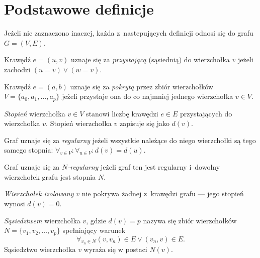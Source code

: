 \section{Podstawowe definicje}\label{s_definitions}

Jeżeli nie zaznaczono inaczej, każda z~nastepujących definicji odnosi się do
grafu $G=(V,E)$.

\begin{definition}
  Krawędź $e=(u,v)$ uznaje się za \emph{przystającą} (sąsiednią) do wierzchołka $v$
  jeżeli zachodzi $(u=v) \lor (w=v)$.
\end{definition}

\begin{definition}
  Krawędź $e=(a,b)$ uznaje się za \emph{pokrytą} przez zbiór wierzchołków \\
  $V=\{a_0, a_1, \ldots, a_p\}$ jeżeli przystaje ona do co najmniej jednego
  wierzchołka $v \in V$.
\end{definition}

\begin{definition}
  \emph{Stopień} wierzchołka $v \in V$ stanowi liczbę krawędzi $e \in E$ przystających do wierzchołka $v$.
  Stopień wierzchołka $v$ zapisuje się jako $d(v)$.
\end{definition}

\begin{definition}
  Graf uznaje się za \emph{regularny} jeżeli wszystkie należące do niego wierzchołki są tego samego stopnia: $\forall_{v \in V}: \forall_{u \in V}:{d(v)=d(u)}$.
\end{definition}

\begin{definition}
  Graf uznaje się za \emph{$N$-regularny} jeżeli graf ten jest regularny i~dowolny wierzchołek grafu jest stopnia $N$.
\end{definition}

\begin{definition}
  \emph{Wierzchołek izolowany} $v$ nie pokrywa żadnej z~krawędzi grafu --- jego stopień wynosi $d(v)=0$.
\end{definition}

\begin{definition}
  \emph{Sąsiedztwem} wierzchołka $v$, gdzie $d(v)=p$ nazywa się zbiór wierzchołków $N=\{v_1, v_2, \ldots, v_p\}$ spełniający warunek 
  \[\forall_{v_n \in N}{(v,v_n) \in E \lor (v_n,v) \in E}.\]
  Sąsiedztwo wierzchołka $v$ wyraża się w postaci $N(v)$.
\end{definition}

